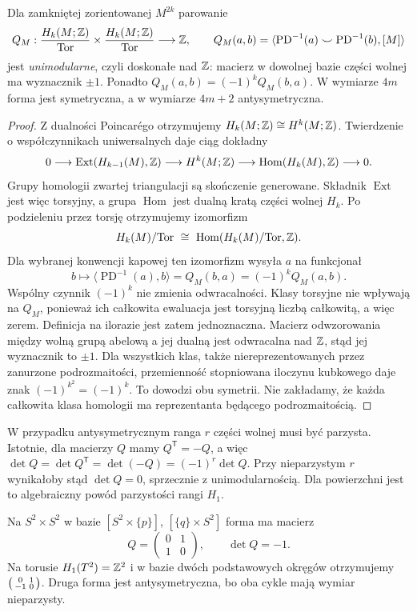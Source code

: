 \begin{twierdzenie}
\label{thm:forma-przeciecia-16}
Dla zamkniętej
zorientowanej
$M^{2k}$ parowanie
\[
 Q_M:
 \frac{H_k(M;\mathbb{Z})}{\mathrm{Tor}}
 \times
 \frac{H_k(M;\mathbb{Z})}{\mathrm{Tor}}
   \longrightarrow\mathbb{Z},
 \qquad
 Q_M(a,b)=
 \langle\operatorname{PD}^{-1}(a)
 \smile\operatorname{PD}^{-1}(b),[M]\rangle
\]
jest \emph{unimodularne}, czyli doskonałe nad $\mathbb{Z}$:
macierz w dowolnej bazie
części wolnej ma wyznacznik
$\pm1$. Ponadto
$Q_M(a,b)=(-1)^kQ_M(b,a)$.
W wymiarze $4m$ forma
jest symetryczna, a
w wymiarze $4m+2$
antysymetryczna.
\end{twierdzenie}
\begin{proof}
Z dualności Poincarégo
otrzymujemy
$H_k(M;\mathbb{Z})\cong H^k(M;\mathbb{Z})$.
Twierdzenie o
współczynnikach
uniwersalnych daje
ciąg dokładny
\[
0\longrightarrow
 \operatorname{Ext}
     (H_{k-1}(M),\mathbb{Z})
 \longrightarrow H^k(M;\mathbb{Z})
 \longrightarrow
 \operatorname{Hom}(H_k(M),\mathbb{Z})
 \longrightarrow0.
\]
Grupy homologii
zwartej triangulacji
są skończenie
generowane.
Składnik $\operatorname{Ext}$
jest więc torsyjny,
a grupa $\operatorname{Hom}$
jest dualną kratą
części wolnej $H_k$.
Po podzieleniu przez
torsję otrzymujemy
izomorfizm
\[
 H_k(M)/\mathrm{Tor}
 \ \cong\
 \operatorname{Hom}
    (H_k(M)/\mathrm{Tor},\mathbb{Z}).
\]
Dla wybranej konwencji kapowej ten izomorfizm
wysyła $a$ na funkcjonał
\[
 b\longmapsto\langle\operatorname{PD}^{-1}(a),b\rangle
 =Q_M(b,a)=(-1)^kQ_M(a,b).
\]
Wspólny czynnik $(-1)^k$ nie zmienia odwracalności.
Klasy torsyjne nie wpływają na $Q_M$, ponieważ
ich całkowita ewaluacja jest torsyjną liczbą całkowitą,
a więc zerem. Definicja na ilorazie jest zatem jednoznaczna.
Macierz odwzorowania
między wolną grupą
abelową a jej dualną
jest odwracalna nad
$\mathbb{Z}$, stąd jej
wyznacznik to $\pm1$.
Dla wszystkich klas, także niereprezentowanych
przez zanurzone podrozmaitości, przemienność
stopniowana iloczynu kubkowego daje znak
$(-1)^{k^2}=(-1)^k$. To dowodzi obu symetrii.
Nie zakładamy, że każda całkowita klasa homologii
ma reprezentanta będącego podrozmaitością.
\end{proof}

W przypadku antysymetrycznym ranga $r$ części wolnej
musi być parzysta. Istotnie, dla macierzy $Q$ mamy
$Q^{\mathsf T}=-Q$, a więc
$\det Q=\det Q^{\mathsf T}=\det(-Q)=(-1)^r\det Q$.
Przy nieparzystym $r$ wynikałoby stąd $\det Q=0$,
sprzecznie z unimodularnością. Dla powierzchni
jest to algebraiczny powód parzystości rangi $H_1$.

\begin{przyklad}
Na $S^2\times S^2$
w bazie
$[S^2\times\{p\}]$,
$[\{q\}\times S^2]$
forma ma macierz
\[
 Q=
 \begin{pmatrix}
  0&1\\1&0
 \end{pmatrix},
 \qquad\det Q=-1.
\]
Na torusie
$H_1(T^2)=\mathbb{Z}^2$
i w bazie dwóch
podstawowych okręgów
otrzymujemy
$\begin{psmallmatrix}
0&1\\-1&0
\end{psmallmatrix}$.
Druga forma jest
antysymetryczna,
bo oba cykle mają
wymiar nieparzysty.
\end{przyklad}

